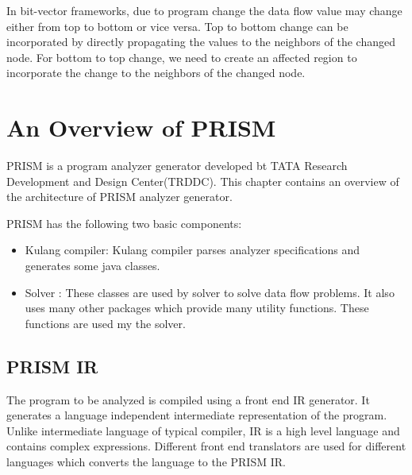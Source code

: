 \documentclass[11pt,a4paper,openright]{report}
\begin{document}
In bit-vector frameworks, due to program change the data flow value may change either from top to bottom or vice versa. Top to bottom change can
be incorporated by directly propagating the values to the neighbors of the changed node. For bottom to top change, we need to create an affected 
region to incorporate the change to the neighbors of the changed node.

\chapter{An Overview of PRISM}
PRISM is a program analyzer generator developed bt TATA Research Development and Design Center(TRDDC).
This chapter contains an overview of the architecture of PRISM analyzer generator.

PRISM has the following two basic components:
\begin{itemize}
 \item Kulang compiler: Kulang compiler parses analyzer specifications and generates some java classes.
 \item Solver : These classes are used by solver to solve data flow problems. It also uses many other packages which provide many utility functions. These functions are used 
 my the solver.
\end{itemize}

\section{PRISM IR}
The program to be analyzed is compiled using a front end IR generator. It generates a language independent intermediate representation of the program. Unlike intermediate
language of typical compiler, IR is a high level language and contains complex expressions. Different front end translators are used for different languages which converts
the language to the PRISM IR.
\end{document}
